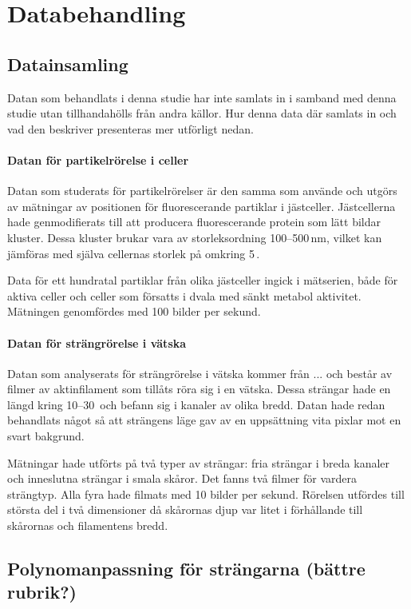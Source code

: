 \chapter{Databehandling}


\section{Datainsamling}
Datan som behandlats i denna studie har inte samlats in i samband med denna studie utan tillhandahölls från andra källor. Hur denna data där samlats in och vad den beskriver presenteras mer utförligt nedan.

\subsubsection{Datan för partikelrörelse i celler}
Datan som studerats för partikelrörelser är den samma som \cite{Midtveldt_etal2016} använde och utgörs av mätningar av positionen för fluorescerande partiklar i jästceller. Jästcellerna hade genmodifierats till att producera fluorescerande protein som lätt bildar kluster. 
Dessa kluster brukar vara av storleksordning 100--500\,nm, vilket kan jämföras med själva cellernas storlek på omkring 5\,.

Data för ett hundratal partiklar från olika jästceller ingick i mätserien, både för aktiva celler och celler som försatts i dvala med sänkt metabol aktivitet. Mätningen genomfördes med 100 bilder per sekund.


\subsubsection{Datan för strängrörelse i vätska}

Datan som analyserats för strängrörelse i vätska kommer från ... och består av filmer av aktinfilament som tillåts röra sig i en vätska. Dessa strängar hade en längd kring 10--30\, och befann sig i kanaler av olika bredd. Datan hade redan behandlats något så att strängens läge gav av en uppsättning vita pixlar mot en svart bakgrund.

Mätningar hade utförts på två typer av strängar: fria strängar i breda kanaler och inneslutna strängar i smala skåror. Det fanns två filmer för vardera strängtyp. Alla fyra hade filmats med 10 bilder per sekund. Rörelsen utfördes till största del i två dimensioner då skårornas djup var litet i förhållande till skårornas och filamentens bredd.


\section{Polynomanpassning för strängarna (bättre rubrik?)}







